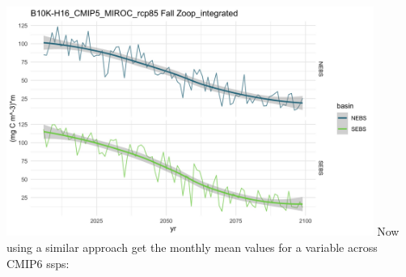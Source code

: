 \documentclass[
]{article}
\begin{document}
\includegraphics[width=0.9\textwidth,height=\textheight]{Figs/Fall_large_Zoop.jpg}
Now using a similar approach get the monthly mean values for a variable
across CMIP6 ssps:
\end{document}
